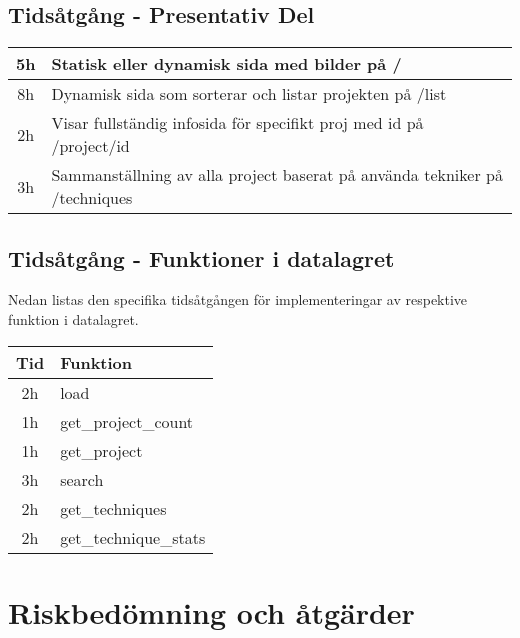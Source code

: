 \documentclass{TDP003mall}
\begin{document}
\subsection{Tidsåtgång - Presentativ Del}
\begin{tabular}{|c|l|}
  \hline
  5h & Statisk eller dynamisk sida med bilder på /\\
  \hline
  8h & Dynamisk sida som sorterar och listar projekten på /list\\
  \hline
  2h & Visar fullständig infosida för specifikt proj med id på /project/id\\
  \hline
  3h & Sammanställning av alla project baserat på använda tekniker på /techniques\\
  \hline
\end{tabular}

\subsection{Tidsåtgång - Funktioner i datalagret}
Nedan listas den specifika tidsåtgången för implementeringar av respektive funktion i datalagret.

\begin{tabular}{|c|l|}
  \hline
  Tid & Funktion\\
  \hline
  2h & load\\
  \hline
  1h & get\_project\_count\\
  \hline
  1h & get\_project\\
  \hline
  3h & search\\
  \hline
  2h & get\_techniques\\
  \hline
  2h & get\_technique\_stats\\
  \hline
\end{tabular}

\section{Riskbedömning och åtgärder}
\end{document}
